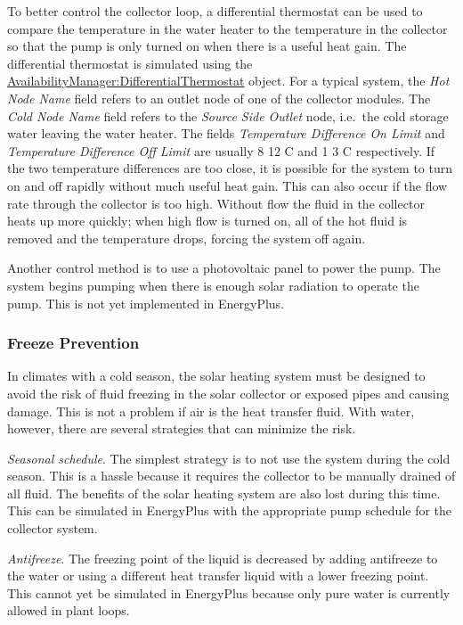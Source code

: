 To better control the collector loop, a differential thermostat can be used to compare the temperature in the water heater to the temperature in the collector so that the pump is only turned on when there is a useful heat gain. The differential thermostat is simulated using the \hyperref[availabilitymanagerdifferentialthermostat]{AvailabilityManager:DifferentialThermostat} object. For a typical system, the \emph{Hot Node Name} field refers to an outlet node of one of the collector modules. The \emph{Cold Node Name} field refers to the \emph{Source Side Outlet} node, i.e.~the cold storage water leaving the water heater. The fields \emph{Temperature Difference On Limit} and \emph{Temperature Difference Off Limit} are usually 8 12 C and 1 3 C respectively. If the two temperature differences are too close, it is possible for the system to turn on and off rapidly without much useful heat gain. This can also occur if the flow rate through the collector is too high. Without flow the fluid in the collector heats up more quickly; when high flow is turned on, all of the hot fluid is removed and the temperature drops, forcing the system off again.

Another control method is to use a photovoltaic panel to power the pump. The system begins pumping when there is enough solar radiation to operate the pump. This is not yet implemented in EnergyPlus.

\subsubsection{Freeze Prevention}\label{freeze-prevention}

In climates with a cold season, the solar heating system must be designed to avoid the risk of fluid freezing in the solar collector or exposed pipes and causing damage. This is not a problem if air is the heat transfer fluid. With water, however, there are several strategies that can minimize the risk.

\emph{Seasonal schedule}. The simplest strategy is to not use the system during the cold season. This is a hassle because it requires the collector to be manually drained of all fluid. The benefits of the solar heating system are also lost during this time. This can be simulated in EnergyPlus with the appropriate pump schedule for the collector system.

\emph{Antifreeze}. The freezing point of the liquid is decreased by adding antifreeze to the water or using a different heat transfer liquid with a lower freezing point. This cannot yet be simulated in EnergyPlus because only pure water is currently allowed in plant loops.

